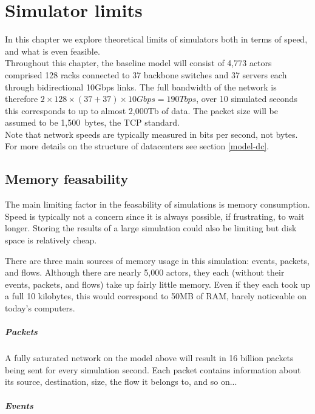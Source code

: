 \chapter{Simulator limits} \label{limits}

In this chapter we explore theoretical limits of simulators both in terms of speed, and what is even feasible.
\\

Throughout this chapter, the baseline model will consist of 4,773 actors comprised 128 racks connected to 37 backbone switches and 37 servers each through bidirectional 10Gbps links.
The full bandwidth of the network is therefore $2\times128\times(37+37)\times10Gbps = 190Tbps$, over 10 simulated seconds this corresponds to up to almost 2,000Tb of data.
The packet size will be assumed to be 1,500~bytes, the TCP standard. \\
Note that network speeds are typically measured in bits per second, not bytes.
For more details on the structure of datacenters see section \ref{model-dc}.

\section{Memory feasability} \label{limits-mem}

The main limiting factor in the feasability of simulations is memory consumption.
Speed is typically not a concern since it is always possible, if frustrating, to wait longer.
Storing the results of a large simulation could also be limiting but disk space is relatively cheap.

There are three main sources of memory usage in this simulation: events, packets, and flows.
Although there are nearly 5,000 actors, they each (without their events, packets, and flows) take up fairly little memory.
Even if they each took up a full 10 kilobytes, this would correspond to 50MB of RAM, barely noticeable on today's computers.

\paragraph{Packets}
A fully saturated network on the model above will result in 16 billion packets being sent for every simulation second.
Each packet contains information about its source, destination, size, the flow it belongs to, and so on...

\paragraph{Events}


